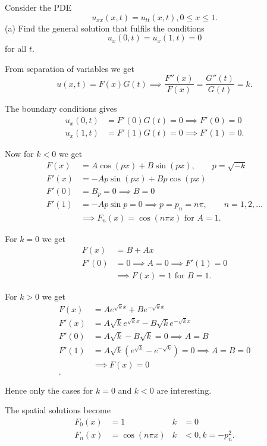 Consider the PDE
\[ 
u_{xx} (x,t) = u_{t t}(x,t), 0 \leq x \leq 1
.\]
(a) Find the general solution that fulfils the conditions
\[ 
u_x(0,t) = u_x(1,t) = 0
\]
for all $t$. 

\hr

From separation of variables we get
\[ 
u(x,t) = F(x)G(t) \implies \frac{F''(x)}{F(x)} = \frac{G''(t)}{G(t)} = k
.\]

The boundary conditions gives
\begin{align*}
  u_x(0,t) &= F'(0) G(t) = 0 \implies F'(0) = 0 \\
  u_x(1,t) &= F'(1) G(t) = 0 \implies F'(1) = 0
.\end{align*}

Now for $k < 0$ we get
\begin{align*}
  F(x) &= A \cos (px) + B \sin (px), \qquad  p = \sqrt{-k} \\
  F'(x) &= - A p \sin (px) + Bp \cos (px) \\
  F'(0) &= B_p = 0 \implies B = 0\\
  F'(1) &= -A p \sin p = 0 \implies p = p_n = n \pi, \qquad n = 1,2, \ldots  \\
        &\implies F_n(x) = \cos (n \pi x) \text{ for } A = 1
.\end{align*}

For $k = 0$ we get
\begin{align*}
  F(x) &= B + Ax \\
  F'(0) &= 0 \implies A = 0 \implies F'(1) = 0 \\
        &\implies F(x) = 1 \text{ for } B = 1
.\end{align*}

For $k > 0$ we get
\begin{align*}
  F(x) &= A e^{\sqrt{k}x} + B e^{- \sqrt{k}x} \\
  F'(x) &= A \sqrt{k}e^{\sqrt{k}x} - B \sqrt{k}e^{- \sqrt{k}x} \\
  F'(0) &= A \sqrt{k} - B \sqrt{k} = 0 \implies A = B \\
  F'(1) &= A \sqrt{k} \left( e^{\sqrt{k}} - e^{- \sqrt{k}} \right) = 0 \implies A = B = 0 \\
        &\implies F(x) = 0 \\
.\end{align*}

Hence only the cases for $k = 0$ and $k < 0$ are interesting.

The spatial solutions become
\begin{align*}
  F_0(x) &= 1 & k &= 0 \\
  F_n(x) &= \cos (n\pi x) & k &< 0, k = -p^2_n
.\end{align*}

